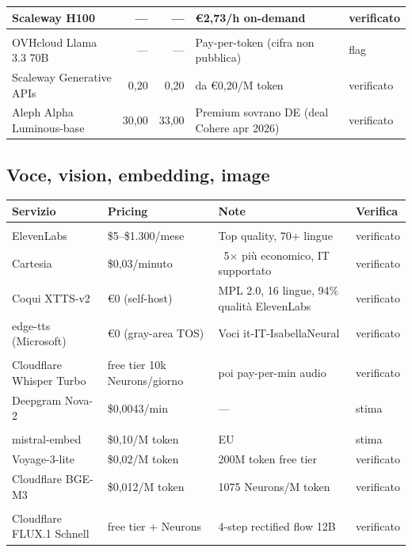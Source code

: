 \documentclass[12pt,a4paper]{article}
\begin{document}
\begin{center}
\begin{tabular}{l r r p{3.5cm} l}
Scaleway H100         & --- & --- & €2,73/h on-demand & verificato \\
\midrule
\rowcolor{elabnavy!8}\multicolumn{5}{l}{\textbf{EU sovereign}} \\
OVHcloud Llama 3.3 70B & --- & --- & Pay-per-token (cifra non pubblica) & flag \\
Scaleway Generative APIs & 0,20 & 0,20 & da €0,20/M token & verificato \\
Aleph Alpha Luminous-base & 30,00 & 33,00 & Premium sovrano DE (deal Cohere apr 2026) & verificato \\
\bottomrule
\end{tabular}
\end{center}

\subsection{Voce, vision, embedding, image}

\begin{center}
\renewcommand{\arraystretch}{1.2}
\begin{tabular}{l l p{4.5cm} l}
\toprule
\textbf{Servizio} & \textbf{Pricing} & \textbf{Note} & \textbf{Verifica} \\
\midrule
\rowcolor{elablime!8}\multicolumn{4}{l}{\textbf{TTS}} \\
ElevenLabs        & \$5--\$1.300/mese & Top quality, 70+ lingue & verificato \\
Cartesia          & \$0,03/minuto & ~5$\times$ più economico, IT supportato & verificato \\
Coqui XTTS-v2     & €0 (self-host) & MPL 2.0, 16 lingue, 94\% qualità ElevenLabs & verificato \\
edge-tts (Microsoft) & €0 (gray-area TOS) & Voci it-IT-IsabellaNeural & verificato \\
\midrule
\rowcolor{elablime!8}\multicolumn{4}{l}{\textbf{STT}} \\
Cloudflare Whisper Turbo & free tier 10k Neurons/giorno & poi pay-per-min audio & verificato \\
Deepgram Nova-2  & \$0,0043/min & --- & stima \\
\midrule
\rowcolor{elablime!8}\multicolumn{4}{l}{\textbf{Embeddings}} \\
mistral-embed     & \$0,10/M token & EU & stima \\
Voyage-3-lite     & \$0,02/M token & 200M token free tier & verificato \\
Cloudflare BGE-M3 & \$0,012/M token & 1075 Neurons/M token & verificato \\
\midrule
\rowcolor{elablime!8}\multicolumn{4}{l}{\textbf{Image generation}} \\
Cloudflare FLUX.1 Schnell & free tier + Neurons & 4-step rectified flow 12B & verificato \\
\bottomrule
\end{tabular}
\end{center}
\end{document}
